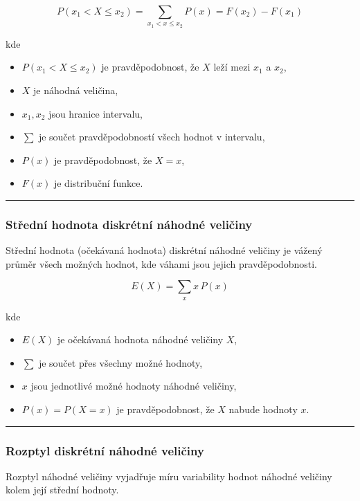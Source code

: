 \documentclass[a4paper, 11pt]{article}
\begin{document}
\begin{equation*}
	P(x_1 < X \le x_2)
	=
	\sum_{x_1 < x \le x_2} P(x)
	=
	F(x_2) - F(x_1)
\end{equation*}

kde

\begin{itemize}[noitemsep]
	\item $P(x_1 < X \le x_2)$ je pravděpodobnost, že $X$ leží mezi $x_1$ a $x_2$,
	\item $X$ je náhodná veličina,
	\item $x_1, x_2$ jsou hranice intervalu,
	\item $\sum$ je součet pravděpodobností všech hodnot v intervalu,
	\item $P(x)$ je pravděpodobnost, že $X = x$,
	\item $F(x)$ je distribuční funkce.
\end{itemize}

\noindent\hrule\medskip

\subsubsection{Střední hodnota diskrétní náhodné veličiny}

Střední hodnota (očekávaná hodnota) diskrétní náhodné veličiny
je vážený průměr všech možných hodnot, kde váhami jsou jejich
pravděpodobnosti.

\begin{equation*}
	E(X) = \sum_{x} x\,P(x)
\end{equation*}

kde

\begin{itemize}[noitemsep]
	\item $E(X)$ je očekávaná hodnota náhodné veličiny $X$,
	\item $\sum$ je součet přes všechny možné hodnoty,
	\item $x$ jsou jednotlivé možné hodnoty náhodné veličiny,
	\item $P(x)=P(X=x)$ je pravděpodobnost, že $X$ nabude hodnoty $x$.
\end{itemize}

\noindent\hrule\medskip

\subsubsection{Rozptyl diskrétní náhodné veličiny}

Rozptyl náhodné veličiny vyjadřuje míru variability
hodnot náhodné veličiny kolem její střední hodnoty.
\end{document}
